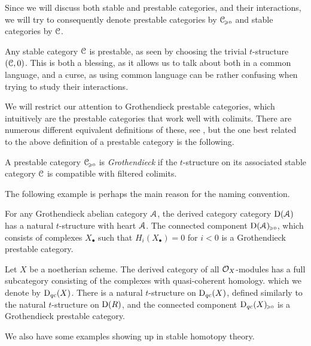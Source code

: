 Since we will discuss both stable and prestable categories, and their interactions, we will try to consequently denote prestable categories by $\EuScript{C}_{\hspace{-1pt}\scriptscriptstyle\geqslant 0}$ and stable categories by $\EuScript{C}$. 

\begin{remark}
    \label{ch3:rm:stable-is-prestable}
    Any stable category $\EuScript{C}$ is prestable, as seen by choosing the trivial $t$-structure $(\EuScript{C},0)$. This is both a blessing, as it allows us to talk about both in a common language, and a curse, as using common language can be rather confusing when trying to study their interactions.
\end{remark}

We will restrict our attention to Grothendieck prestable categories, which intuitively are the prestable categories that work well with colimits. There are numerous different equivalent definitions of these, see \cite[C.1.4.1]{lurie_SAG}, but the one best related to the above definition of a prestable category is the following. 

\begin{definition}
    A prestable category $\EuScript{C}_{\hspace{-1pt}\scriptscriptstyle\geqslant 0}$ is \emph{Grothendieck} if the $t$-structure on its associated stable category $\EuScript{C}$ is compatible with filtered colimits. 
\end{definition}

The following example is perhaps the main reason for the naming convention.

\begin{example}
    For any Grothendieck abelian category $\EuScript{A}$, the derived category category $\mathrm{D}(\EuScript{A})$ has a natural $t$-structure with heart $\EuScript{A}$. The connected component $\mathrm{D}(\EuScript{A})_{\hspace{-1pt}\scriptscriptstyle\geqslant 0}$, which consists of complexes $X_\bullet$ such that $H_i(X_\bullet) = 0$ for $i<0$ is a Grothendieck prestable category.  
\end{example}

\begin{example}
    Let $X$ be a noetherian scheme. The derived category of all $\mathcal{O}_X$-modules has a full subcategory consisting of the complexes with quasi-coherent homology. which we denote by $\mathrm{D}_{qc}(X)$. There is a natural $t$-structure on $\mathrm{D}_{qc}(X)$, defined similarly to the natural $t$-structure on $\mathrm{D}(R)$, and the connected component $\mathrm{D}_{qc}(X)_{\hspace{-1pt}\scriptscriptstyle\geqslant 0}$ is a Grothendieck prestable category. 
\end{example}

We also have some examples showing up in stable homotopy theory. 

